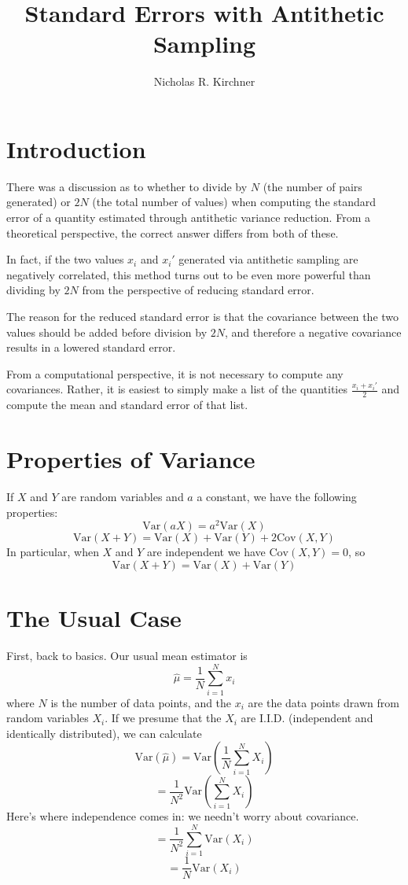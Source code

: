 \documentclass[12pt]{article}
\title{Standard Errors with Antithetic Sampling}
\author{Nicholas R. Kirchner}
\newcommand{\var}{\ensuremath{\text{Var}}}
\newcommand{\cov}{\ensuremath{\text{Cov}}}
\begin{document}
\maketitle

\section{Introduction}

There was a discussion as to whether to divide by $N$ (the number of
pairs generated) or $2N$ (the total number of values) when
computing the standard error of a quantity estimated through
antithetic variance reduction.  From a theoretical perspective, the
correct answer differs from both of these.

In fact, if the two values $x_i$ and $x_i'$ generated via antithetic
sampling are negatively correlated, this method turns out to be even
more powerful than dividing by $2N$ from the perspective of reducing
standard error.

The reason for the reduced standard error is that the covariance
between the two values should be added before division by $2N$, and
therefore a negative covariance results in a lowered standard error.

From a computational perspective, it is not necessary to compute any
covariances.  Rather, it is easiest to simply make a list of the
quantities $\frac{x_i + x_i'}{2}$ and compute the mean and standard
error of that list.

\section{Properties of Variance}
If $X$ and $Y$ are random variables and $a$ a constant, we have the
following properties:
$$ \var (aX) = a^2\var(X) $$
$$ \var (X+Y) = \var(X) + \var(Y) + 2\cov(X,Y) $$
In particular, when $X$ and $Y$ are independent we have $\cov(X,Y)=0$,
so
$$ \var (X+Y) = \var(X) + \var(Y) $$

\section{The Usual Case}

First, back to basics.  Our usual mean estimator is
$$ \hat{\mu} = \frac{1}{N} \sum_{i=1}^N x_i $$
where $N$ is the number of data points, and the $x_i$ are the data
points drawn from random variables $X_i$.  If we presume that the
$X_i$ are I.I.D. (independent and identically distributed), we can calculate
$$ \var(\hat{\mu}) = \var \left( \frac{1}{N} \sum_{i=1}^N X_i \right) $$
$$ = \frac{1}{N^2} \var \left( \sum_{i = 1}^N X_i \right) $$
Here's where independence comes in: we needn't worry about covariance.
$$ = \frac{1}{N^2} \sum_{i = 1}^N \var(X_i) $$
$$ = \frac{1}{N}\var(X_i) $$
\end{document}
